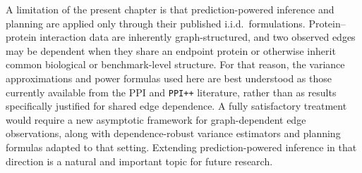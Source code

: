 


A limitation of the present chapter is that prediction-powered inference and planning are applied only through their published i.i.d.\ formulations. Protein--protein interaction data are inherently graph-structured, and two observed edges may be dependent when they share an endpoint protein or otherwise inherit common biological or benchmark-level structure. For that reason, the variance approximations and power formulas used here are best understood as those currently available from the PPI and \texttt{PPI++} literature, rather than as results specifically justified for shared edge dependence. A fully satisfactory treatment would require a new asymptotic framework for graph-dependent edge observations, along with dependence-robust variance estimators and planning formulas adapted to that setting. Extending prediction-powered inference in that direction is a natural and important topic for future research.

